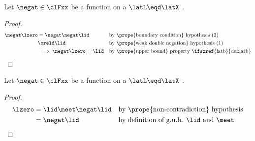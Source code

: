 \begin{lemma}
\label{lem:latn_boundaries}
Let $\negat\in\clFxx$ be a function on a  $\latL\eqd\latX$ .
\end{lemma}
\begin{proof}
  \begin{align*}
    \negat\lzero
      &= \negat\negat\lid
      && \text{by \prope{boundary condition} hypothesis (2)}
    \\&\oreld \lid
      && \text{by \prope{weak double negation} hypothesis (1)}
    \\&\implies \negat\lzero=\lid
      && \text{by \prope{upper bound} property \ifsxref{latb}{def:latb}}
  \end{align*}
\end{proof}


\begin{lemma}
\label{lem:latn_noncon}
Let $\negat\in\clFxx$ be a function on a  $\latL\eqd\latX$ .
\end{lemma}
\begin{proof}
  \begin{align*}
    \lzero
      &= \lid \meet \negat\lid
      && \text{by \prope{non-contradiction} hypothesis}
    \\&= \negat\lid
      && \text{by definition of g.u.b. $\lid$ and $\meet$}
  \end{align*}
\end{proof}

